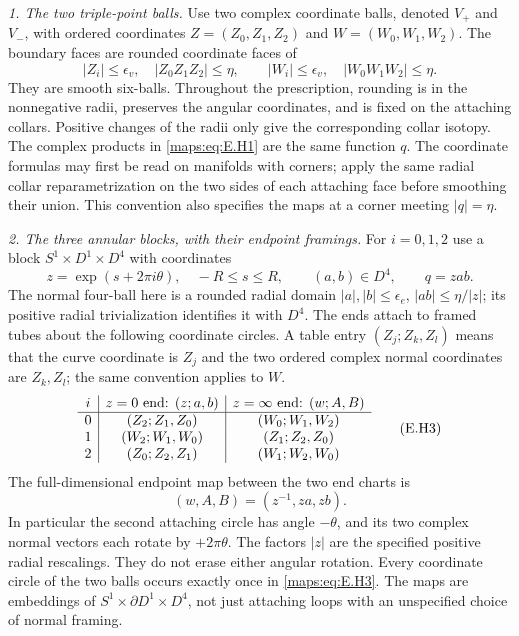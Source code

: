 \begin{theorem}
\emph{1. The two triple-point balls.}
Use two complex coordinate balls, denoted $V_+$ and $V_-$, with
ordered coordinates $Z=(Z_0,Z_1,Z_2)$ and $W=(W_0,W_1,W_2)$.
The boundary faces are rounded coordinate faces of
\[
 |Z_i|\leq\epsilon_v,\quad |Z_0Z_1Z_2|\leq\eta,
 \qquad
 |W_i|\leq\epsilon_v,\quad |W_0W_1W_2|\leq\eta.
 \tag{E.H1}\label{maps:eq:E.H1}
\]
They are smooth six-balls.  Throughout the prescription, rounding is
in the nonnegative radii, preserves the angular coordinates, and is
fixed on the attaching collars.  Positive changes of the radii only
give the corresponding collar isotopy.  The complex products in
\eqref{maps:eq:E.H1} are the same function $q$.
The coordinate formulas may first be read on manifolds with corners;
apply the same radial collar reparametrization on the two sides of
each attaching face before smoothing their union.  This convention
also specifies the maps at a corner meeting $|q|=\eta$.

\emph{2. The three annular blocks, with their endpoint framings.}
For $i=0,1,2$ use a block $S^1\times D^1\times D^4$ with coordinates
\[
 z=\exp(s+2\pi i\theta),\quad -R\leq s\leq R,
 \qquad (a,b)\in D^4,\qquad q=zab.
 \tag{E.H2}\label{maps:eq:E.H2}
\]
The normal four-ball here is a rounded radial domain
$|a|,|b|\leq\epsilon_e$, $|ab|\leq\eta/|z|$;
its positive radial trivialization identifies it with $D^4$.
The ends attach to framed tubes about the following coordinate
circles.  A table entry $(Z_j;Z_k,Z_l)$ means that the curve
coordinate is $Z_j$ and the two ordered complex normal coordinates
are $Z_k,Z_l$; the same convention applies to $W$.
\[
\begin{array}{c|c|c}
 i&z=0\hbox{ end: }(z;a,b)&z=\infty\hbox{ end: }(w;A,B)\\ \hline
0&(Z_2;Z_1,Z_0)&(W_0;W_1,W_2)\\
1&(W_2;W_1,W_0)&(Z_1;Z_2,Z_0)\\
2&(Z_0;Z_2,Z_1)&(W_1;W_2,W_0)
\end{array}
\tag{E.H3}\label{maps:eq:E.H3}
\]
The full-dimensional endpoint map between the two end charts is
\[
                 (w,A,B)=(z^{-1},za,zb).
 \tag{E.H4}\label{maps:eq:E.H4}
\]
In particular the second attaching circle has angle $-\theta$,
and its two complex normal vectors each rotate by $+2\pi\theta$.
The factors $|z|$ are the specified positive radial rescalings.
They do not erase either angular rotation.  Every coordinate circle
of the two balls occurs exactly once in \eqref{maps:eq:E.H3}.  The maps are
embeddings of $S^1\times\partial D^1\times D^4$, not just attaching
loops with an unspecified choice of normal framing.


\end{theorem}
